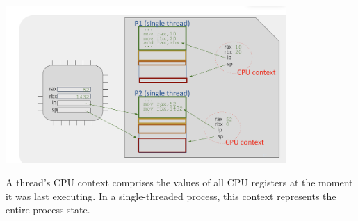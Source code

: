 \begin{center}
    \includegraphics[width=0.8\textwidth]{chapters/L2/images/cpu_context.png}
\end{center}

\begin{definition}
A thread's CPU context comprises the values of all CPU registers at the moment it was last executing. In a single-threaded process, this context represents the entire process state.
\end{definition}

